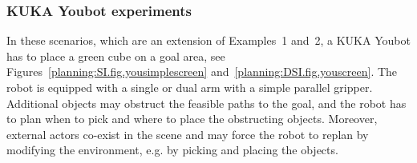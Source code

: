 \subsubsection{KUKA Youbot experiments}


In these scenarios, which are an extension of Examples~1 and~2, a KUKA Youbot has to place a green cube on a goal area, see Figures~\ref{planning:SI.fig.yousimplescreen} and~\ref{planning:DSI.fig.youscreen}. The robot is equipped with a single or dual arm with a simple parallel gripper. Additional objects may obstruct the feasible paths to the goal, and the robot has to plan when to pick and where to place  the obstructing objects. Moreover, external actors  co-exist in the scene and may force the robot to replan by modifying the environment, e.g. by picking and placing the objects.
